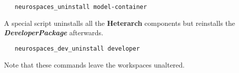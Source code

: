 \documentclass[12pt]{article}
\begin{document}
\begin{verbatim}
   neurospaces_uninstall model-container
\end{verbatim}
A special script uninstalls all the {\bf\small Heterarch} components but reinstalls the
{\bf{\emph{DeveloperPackage}}} afterwards.

\begin{verbatim}
   neurospaces_dev_uninstall developer
\end{verbatim}
Note that these commands leave the workspaces unaltered.
\end{document}
